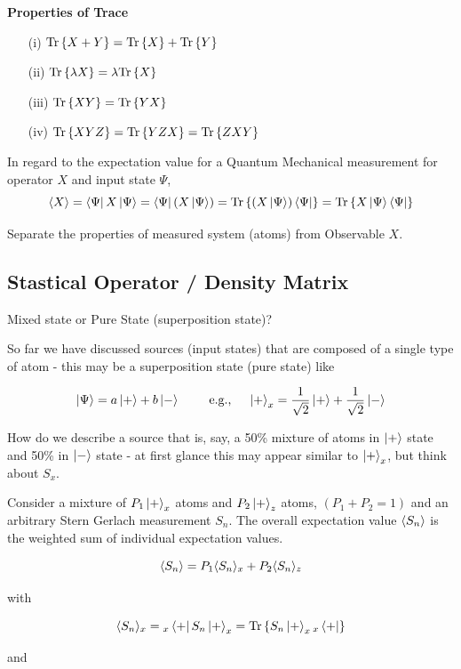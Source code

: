 \documentclass[english, 11pt]{article}
\begin{document}
      \textbf{Properties of Trace}

      \begin{itemize}
        \item[(i)] $\mbox{Tr}\left\{ X+Y \right\} = \mbox{Tr}\left\{ X \right\} + \mbox{Tr}\left\{ Y \right\}$
        \item[(ii)] $\mbox{Tr}\left\{ \lambda X \right\} = \lambda\mbox{Tr}\left\{ X \right\}$
        \item[(iii)] $\mbox{Tr}\left\{ XY \right\} = \mbox{Tr}\left\{ YX \right\}$
        \item[(iv)] $\mbox{Tr}\left\{ XYZ \right\} = \mbox{Tr}\left\{ YZX \right\} = \mbox{Tr}\left\{ ZXY \right\}$
      \end{itemize}

      In regard to the expectation value for a Quantum Mechanical measurement for operator $X$ and input state $\Psi$,
      \[ \langle X \rangle = \left\langle\Psi\right|X\left|\Psi\right\rangle = \left\langle\Psi\right|\left( X\left|\Psi\right\rangle \right) = \mbox{Tr}\left\{  \left( X\left|\Psi\right\rangle \right)\left\langle\Psi\right| \right\} = \mbox{Tr}\left\{ X\left|\Psi\right\rangle\left\langle\Psi\right| \right\}\]

      Separate the properties of measured system (atoms) from Observable $X$.

    \subsection{Stastical Operator / Density Matrix}

      Mixed state or Pure State (superposition state)?
      \newline

      So far we have discussed sources (input states) that are composed of a single type of atom - this may be a superposition state (pure state) like

      \[ \ket{\Psi} = a\kp + b\km \ \ \ \ \ \ \ \mbox{e.g., \ \ \ } \kp_x = \f{1}{\sqrt{2}}\kp + \f{1}{\sqrt{2}}\km \]

      How do we describe a source that is, say, a 50\% mixture of atoms in $\left|+\right\rangle$ state and 50\% in $\left|-\right\rangle$ state - at first glance this may appear similar to $\left|+\right\rangle_x$, but think about $S_x$. \newline

      Consider a mixture of $P_1 \left|+\right\rangle_x$ atoms and $P_2 \left|+\right\rangle_z$ atoms, $(P_1 +P_2 = 1)$ and an arbitrary Stern Gerlach measurement $S_n$. The overall expectation value $\langle S_n \rangle$ is the weighted sum of individual expectation values.

      \[ \langle S_n \rangle = P_1 \langle S_n \rangle_x + P_2\langle S_n \rangle_z \]

      with

      \[ \langle S_n \rangle_x = {}_x\left\langle+\right| S_n\left|+\right\rangle_x = \mbox{Tr}\left\{ S_n\left|+\right\rangle_x {}_x\left\langle+\right| \right\} \]

      and
\end{document}
